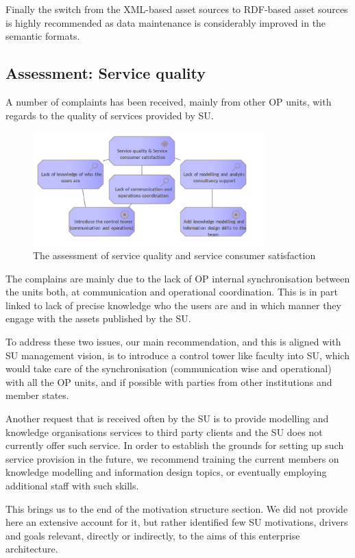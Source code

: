     Finally the switch from the XML-based asset sources to RDF-based asset sources is highly recommended as data maintenance is considerably improved in the semantic formats. 

	\subsection{Assessment: Service quality}

    A number of complaints has been received, mainly from other OP units, with regards to the quality of services provided by SU. 

	\begin{figure}[h]
		\centering
		\includegraphics[width=0.8\textwidth]{images/motivation/Service quality.png}
		\caption{The assessment of service quality and service consumer satisfaction}
		\label{fig:service-quality}
	\end{figure}
	
	The complains are mainly due to the lack of OP internal synchronisation between the units both, at communication and operational coordination. This is in part linked to lack of precise knowledge who the users are and in which manner they engage with the assets published by the SU. 
	
	
	To address these two issues, our main recommendation, and this is aligned with SU management vision, is to introduce a control tower like faculty into SU, which would take care of the synchronisation (communication wise and operational) with all the OP units, and if possible with parties from other institutions and member states.
	
	Another request that is received often by the SU is to provide modelling and knowledge organisations services to third party clients and the SU does not currently offer such service. In order to establish the grounds for setting up such service provision in the future, we recommend training the current members on knowledge modelling and information design topics, or eventually employing additional staff with such skills. 
	
	
	This brings us to the end of the motivation structure section. We did not provide here an extensive account for it, but rather identified few SU motivations, drivers and goals relevant, directly or indirectly, to the aims of this enterprise architecture.